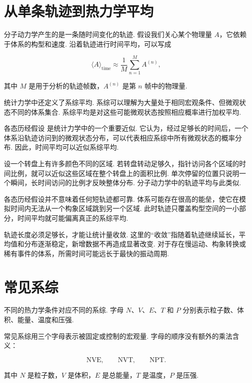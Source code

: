 \documentclass[UTF8,11pt,a4paper,openany]{ctexbook}
\begin{document}
\section{从单条轨迹到热力学平均}

分子动力学产生的是一条随时间变化的轨迹. 假设我们关心某个物理量 $A$，它依赖于体系的构型和速度. 沿着轨迹进行时间平均，可以写成

\[
\langle A\rangle_{\mathrm{time}}
\approx
\frac{1}{M}
\sum_{n=1}^{M}A^{(n)},
\]

其中 $M$ 是用于分析的轨迹帧数，$A^{(n)}$ 是第 $n$ 帧中的物理量. 

统计力学中还定义了系综平均. 系综可以理解为大量处于相同宏观条件、但微观状态不同的体系集合. 系综平均是对这些可能微观状态按照相应概率进行加权平均. 

\begin{definitionbox}
各态历经假设 是统计力学中的一个重要近似. 它认为，经过足够长的时间后，一个体系沿轨迹访问到的微观状态分布，可以代表相应系综中所有微观状态的概率分布. 因此，时间平均可以近似系综平均. 
\end{definitionbox}

\begin{analogybox}
设一个转盘上有许多颜色不同的区域. 若转盘转动足够久，指针访问各个区域的时间比例，就可以近似这些区域在整个转盘上的面积比例. 单次停留的位置只说明一个瞬间，长时间访问的比例才反映整体分布. 分子动力学中的轨迹平均与此类似. 
\end{analogybox}

各态历经假设并不意味着任何短轨迹都可靠. 体系可能存在很高的能垒，使它在模拟时间内无法从一个构象区域跳到另一个区域. 此时轨迹只覆盖构型空间的一小部分，时间平均就可能偏离真正的系综平均. 

\begin{limitbox}
轨迹长度必须足够长，才能让统计量收敛. 这里的“收敛”指随着轨迹继续延长，平均值和分布逐渐稳定，新增数据不再造成显著改变. 对于存在慢运动、构象转换或稀有事件的体系，所需时间可能远长于最快的振动周期. 
\end{limitbox}

\section{常见系综}

不同的热力学条件对应不同的系综. 字母 $N$、$V$、$E$、$T$ 和 $P$ 分别表示粒子数、体积、能量、温度和压强. 

\begin{notationbox}
常见系综用三个字母表示被固定或控制的宏观量. 字母的顺序没有额外的乘法含义：

\[
\mathrm{NVE},\qquad \mathrm{NVT},\qquad \mathrm{NPT}.
\]

其中 $N$ 是粒子数，$V$ 是体积，$E$ 是总能量，$T$ 是温度，$P$ 是压强. 
\end{notationbox}
\end{document}

